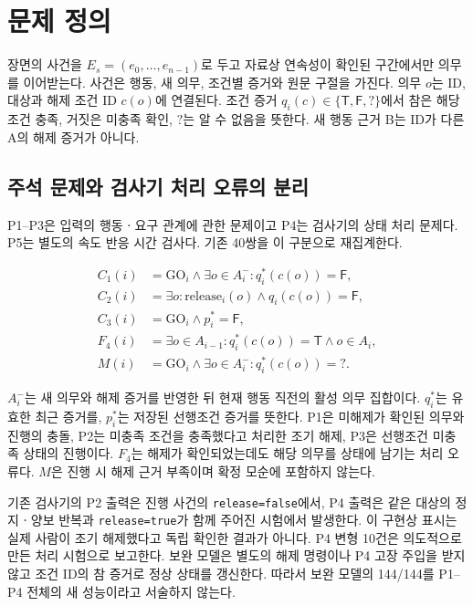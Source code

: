 \section{문제 정의}
\label{sec:problem}

\begin{revision}

장면의 사건을 $E_s=(e_0,\ldots,e_{n-1})$로 두고 자료상 연속성이 확인된 구간에서만 의무를 이어받는다. 사건은 행동, 새 의무, 조건별 증거와 원문 구절을 가진다. 의무 $o$는 ID, 대상과 해제 조건 ID $c(o)$에 연결된다. 조건 증거 $q_i(c)\in\{\mathsf{T},\mathsf{F},?\}$에서 참은 해당 조건 충족, 거짓은 미충족 확인, $?$는 알 수 없음을 뜻한다. 새 행동 근거 B는 ID가 다른 A의 해제 증거가 아니다.

\subsection{주석 문제와 검사기 처리 오류의 분리}
\label{sec:error-types}
P1--P3은 입력의 행동ㆍ요구 관계에 관한 문제이고 P4는 검사기의 상태 처리 문제다. P5는 별도의 속도 반응 시간 검사다. 기존 40쌍을 이 구분으로 재집계한다.

\begin{align}
C_1(i)&=\mathrm{GO}_i\land\exists o\in A_i^-:q_i^*(c(o))=\mathsf{F},\label{eq:hold-conflict}\\
C_2(i)&=\exists o:\mathrm{release}_i(o)\land q_i(c(o))=\mathsf{F},\\
C_3(i)&=\mathrm{GO}_i\land p_i^*=\mathsf{F},\\
F_4(i)&=\exists o\in A_{i-1}:q_i^*(c(o))=\mathsf{T}\land o\in A_i,\\
M(i)&=\mathrm{GO}_i\land\exists o\in A_i^-:q_i^*(c(o))=? .\label{eq:missing-evidence}
\end{align}

$A_i^-$는 새 의무와 해제 증거를 반영한 뒤 현재 행동 직전의 활성 의무 집합이다. $q_i^*$는 유효한 최근 증거를, $p_i^*$는 저장된 선행조건 증거를 뜻한다. P1은 미해제가 확인된 의무와 진행의 충돌, P2는 미충족 조건을 충족했다고 처리한 조기 해제, P3은 선행조건 미충족 상태의 진행이다. $F_4$는 해제가 확인되었는데도 해당 의무를 상태에 남기는 처리 오류다. $M$은 진행 시 해제 근거 부족이며 확정 모순에 포함하지 않는다.

기존 검사기의 P2 출력은 진행 사건의 \texttt{release=false}에서, P4 출력은 같은 대상의 정지ㆍ양보 반복과 \texttt{release=true}가 함께 주어진 시험에서 발생한다. 이 구현상 표시는 실제 사람이 조기 해제했다고 독립 확인한 결과가 아니다. P4 변형 10건은 의도적으로 만든 처리 시험으로 보고한다. 보완 모델은 별도의 해제 명령이나 P4 고장 주입을 받지 않고 조건 ID의 참 증거로 정상 상태를 갱신한다. 따라서 보완 모델의 144/144를 P1--P4 전체의 새 성능이라고 서술하지 않는다.


\end{revision}
